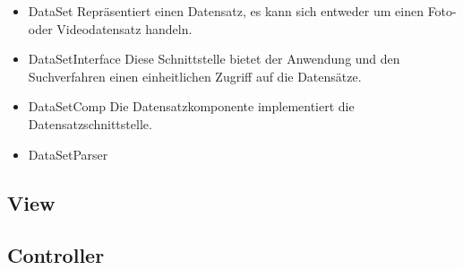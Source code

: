\begin{itemize}
	\item DataSet \newline
Repräsentiert einen Datensatz, es kann sich entweder um einen Foto- oder Videodatensatz handeln.

	\item DataSetInterface \newline
Diese Schnittstelle bietet der Anwendung und den Suchverfahren einen einheitlichen Zugriff auf die Datensätze.

	\item DataSetComp \newline
Die Datensatzkomponente implementiert die Datensatzschnittstelle.

	\item DataSetParser \newline


\end{itemize}

\subsection{View}

\subsection{Controller}